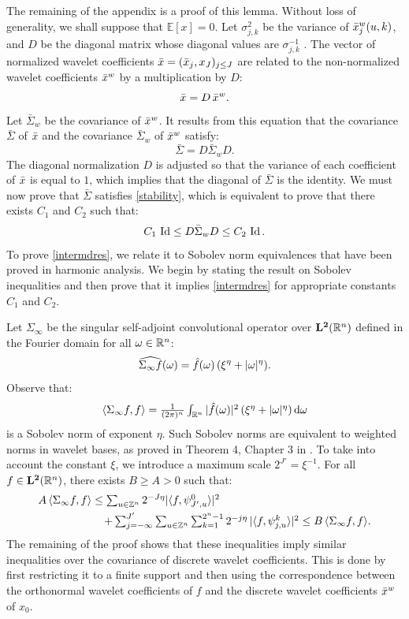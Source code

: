 \documentclass{article}
\begin{document}
The remaining of the appendix is a proof of this lemma.  Without loss of
generality, we shall suppose that ${\mathbb E}[x] = 0$.  Let $\sigma_{j,k}^2$ be
the variance of ${\bar x}^w_{j} (u,k)$, and $D$ be the diagonal matrix whose
diagonal values are $\sigma_{j,k}^{-1}$ .  The vector of normalized wavelet
coefficients ${\bar x} = ({\bar x}_j , x_J)_{j \leq J}$ are related to the non-normalized
wavelet coefficients ${\bar x}^w$ by a multiplication by $D$:
\[
{\bar x} = D\, {\bar x}^w .
\]
 Let $\bar \Sigma_w$ be the covariance of ${\bar x}^w$.  It
results from this equation that the covariance $\bar \Sigma$ of ${\bar x}$ and the
covariance $\bar \Sigma_w$ of ${\bar x}^w$ satisfy:
\begin{equation}
    \label{xwx}
\bar \Sigma = D \bar \Sigma_w  D .
\end{equation}
The diagonal normalization $D$ is adjusted so that the variance of each coefficient of ${\bar x}$ is equal to $1$, which implies that
the diagonal of $\bar \Sigma$ is the identity. We must now prove that $\bar \Sigma$
satisfies \eqref{stability}, which is equivalent to prove
that there exists $C_1$ and $C_2$ such that:
\begin{equation}
\label{intermdres}
C_1\, \operatorname{Id} \leq  D \bar \Sigma_w  D \leq C_2\, \operatorname{Id} .
\end{equation}
To prove \eqref{intermdres},
we relate it to Sobolev norm equivalences that have been
proved in harmonic analysis. We begin by stating the result on Sobolev inequalities and then prove that it implies \eqref{intermdres} for appropriate constants $C_1$ and $C_2$.

Let $\Sigma_\infty$ be the singular self-adjoint
convolutional operator over ${\bf L^2}(\mathbb R^n)$
defined in the Fourier domain for all ${\omega} \in \mathbb R^n$:
\[
\widehat{\Sigma_\infty f}({\omega}) = \hat f({\omega}) \,(\xi^\eta + |{\omega}|^\eta) .
\]
Observe that:
\[
  \textstyle{
{\langle}\Sigma_\infty f , f {\rangle}= \frac 1 {(2 \pi)^n} \int_{\mathbb R^n}
|\hat f({\omega})|^2 \,(\xi^\eta + |{\omega}|^\eta)\, \mathrm{d}{\omega}}
\]
is a Sobolev norm of exponent $\eta$.  Such Sobolev norms are equivalent to
weighted norms in wavelet bases, as proved in Theorem 4, Chapter 3 in
\cite{Meyer:92c}. To take into account the constant $\xi$, we introduce
a maximum scale $2^{J'} = \xi^{-1}$. 
For all $f \in {\bf L^2}(\mathbb R^n)$, there exists $B \geq A > 0$ such that:
\begin{align}
  \label{Sobolev0}
  &A\, {\langle} \Sigma_\infty f , f {\rangle} \leq   \textstyle{
    \sum_{u \in \mathbb Z^n} 2^{-J \eta} |{\langle}f , \psi^0_{{J'},u} {\rangle}|^2} \\
  &\qquad \qquad \qquad \textstyle{+
  \sum_{j =-\infty}^{J'} \sum_{u \in \mathbb Z^n} \sum_{k=1}^{2^n-1}
  2^{-j \eta}\, |{\langle}f , \psi^k_{j,u} {\rangle}|^2 \leq 
  B\, {\langle}\Sigma_\infty f , f {\rangle}.}
\end{align}
The remaining of the proof shows that these inequalities imply similar inequalities
over the covariance of discrete wavelet coefficients. This is done by first restricting it to a finite support and then using the correspondence between the orthonormal wavelet coefficients of
$f$ and the discrete wavelet coefficients ${\bar x}^w$ of $x_0$. 
\end{document}
